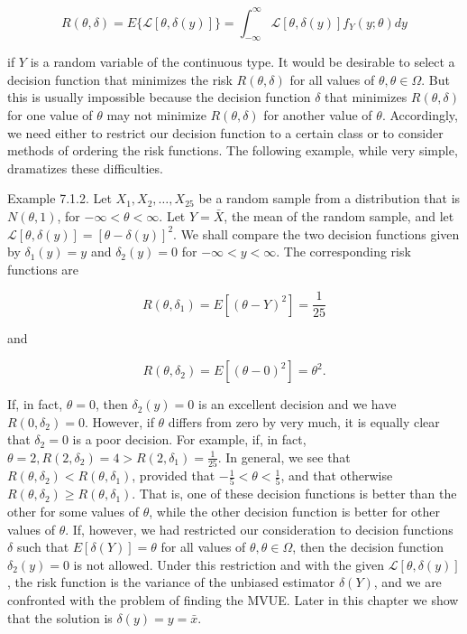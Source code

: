 $$
R(\theta, \delta)=E\{\mathcal{L}[\theta, \delta(y)]\}=\int_{-\infty}^{\infty} \mathcal{L}[\theta, \delta(y)] f_{Y}(y ; \theta) d y
$$

if $Y$ is a random variable of the continuous type. It would be desirable to select a decision function that minimizes the risk $R(\theta, \delta)$ for all values of $\theta, \theta \in \Omega$. But this is usually impossible because the decision function $\delta$ that minimizes $R(\theta, \delta)$ for one value of $\theta$ may not minimize $R(\theta, \delta)$ for another value of $\theta$. Accordingly, we need either to restrict our decision function to a certain class or to consider methods of ordering the risk functions. The following example, while very simple, dramatizes these difficulties.

Example 7.1.2. Let $X_{1}, X_{2}, \ldots, X_{25}$ be a random sample from a distribution that is $N(\theta, 1)$, for $-\infty<\theta<\infty$. Let $Y=\bar{X}$, the mean of the random sample, and let $\mathcal{L}[\theta, \delta(y)]=[\theta-\delta(y)]^{2}$. We shall compare the two decision functions given by $\delta_{1}(y)=y$ and $\delta_{2}(y)=0$ for $-\infty<y<\infty$. The corresponding risk functions are

$$
R\left(\theta, \delta_{1}\right)=E\left[(\theta-Y)^{2}\right]=\frac{1}{25}
$$

and

$$
R\left(\theta, \delta_{2}\right)=E\left[(\theta-0)^{2}\right]=\theta^{2} .
$$

If, in fact, $\theta=0$, then $\delta_{2}(y)=0$ is an excellent decision and we have $R\left(0, \delta_{2}\right)=0$. However, if $\theta$ differs from zero by very much, it is equally clear that $\delta_{2}=0$ is a poor decision. For example, if, in fact, $\theta=2, R\left(2, \delta_{2}\right)=4>R\left(2, \delta_{1}\right)=\frac{1}{25}$. In general, we see that $R\left(\theta, \delta_{2}\right)<R\left(\theta, \delta_{1}\right)$, provided that $-\frac{1}{5}<\theta<\frac{1}{5}$, and that otherwise $R\left(\theta, \delta_{2}\right) \geq R\left(\theta, \delta_{1}\right)$. That is, one of these decision functions is better than the other for some values of $\theta$, while the other decision function is better for other values of $\theta$. If, however, we had restricted our consideration to decision functions $\delta$ such that $E[\delta(Y)]=\theta$ for all values of $\theta, \theta \in \Omega$, then the decision function $\delta_{2}(y)=0$ is not allowed. Under this restriction and with the given $\mathcal{L}[\theta, \delta(y)]$, the risk function is the variance of the unbiased estimator $\delta(Y)$, and we are confronted with the problem of finding the MVUE. Later in this chapter we show that the solution is $\delta(y)=y=\bar{x}$.

